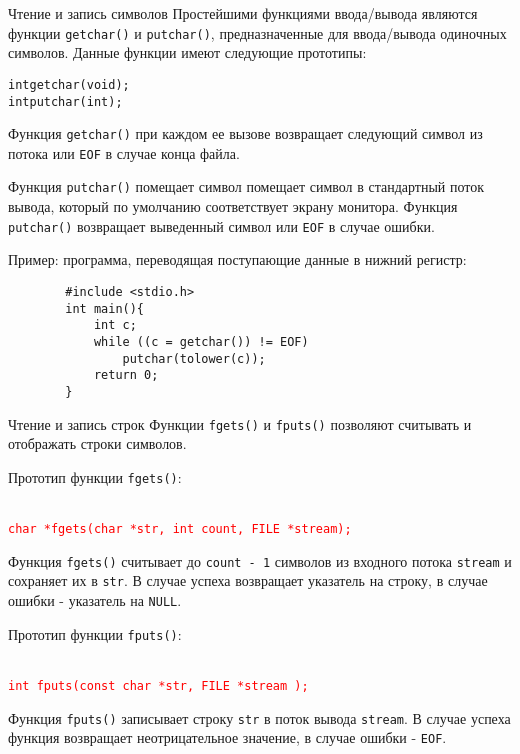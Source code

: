 \documentclass[xcolor=table]{beamer}
\begin{document}
\begin{frame}[fragile]{Чтение и запись символов}
    Простейшими функциями ввода/вывода являются функции \texttt{getchar()} и \texttt{putchar()}, предназначенные для ввода/вывода одиночных символов. Данные функции имеют следующие прототипы:
    \begin{alltt}
        int getchar(void);
        int putchar(int);
    \end{alltt}
    Функция \texttt{getchar()} при каждом ее вызове возвращает следующий символ из потока или \texttt{EOF} в случае конца файла.
    
    Функция \texttt{putchar()} помещает символ помещает символ в стандартный поток вывода, который по умолчанию соответствует экрану монитора. Функция \texttt{putchar()} возвращает выведенный символ или \texttt{EOF} в случае ошибки.
    
    Пример: программа, переводящая поступающие данные в нижний регистр:
    \begin{verbatim}
        #include <stdio.h>
        int main(){
            int c;
            while ((c = getchar()) != EOF)
                putchar(tolower(c));
            return 0;
        }
    \end{verbatim}
\end{frame}

\begin{frame}{Чтение и запись строк}
    Функции \texttt{fgets()} и \texttt{fputs()} позволяют считывать и отображать строки символов. 
    
    Прототип функции \texttt{fgets()}:
    
    \begin{alltt}
    \textcolor{red}{
    \texttt{char *fgets(char *str, int count, FILE *stream);}
    }
    \end{alltt}
    
    Функция \texttt{fgets()} считывает до \texttt{count - 1} символов из входного потока \texttt{stream} и сохраняет их в \texttt{str}. В случае успеха возвращает указатель на строку, в случае ошибки - указатель на \texttt{NULL}.
    
    Прототип функции \texttt{fputs()}:
    
    \begin{alltt}
    \textcolor{red}{
    \texttt{int fputs(const char *str, FILE *stream );}
    }
    \end{alltt}
    
    Функция \texttt{fputs()} записывает строку \texttt{str} в поток вывода \texttt{stream}. В случае успеха функция возвращает неотрицательное значение, в случае ошибки - \texttt{EOF}.
\end{frame}
\end{document}
